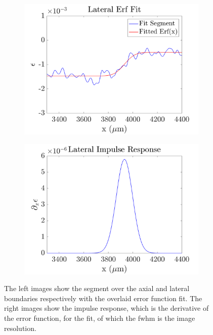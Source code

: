 \begin{figure}[t]
\begin{subfigure}{0.49\textwidth}
		\includegraphics[width=\textwidth]{strainreview_figs/lateral_erf_fit.png}
	\end{subfigure}
	\begin{subfigure}{0.49\textwidth}
		\centering
		\includegraphics[width=\textwidth]{strainreview_figs/lateral_impulse_response.png}
	\end{subfigure}
	\caption{The left images show the segment over the axial and lateral boundaries respectively with the overlaid error function fit. The right images show the impulse response, which is the derivative of the error function, for the fit, of which the \ac{fwhm} is the image resolution.}
	\label{error_fit_example}	
\end{figure}


